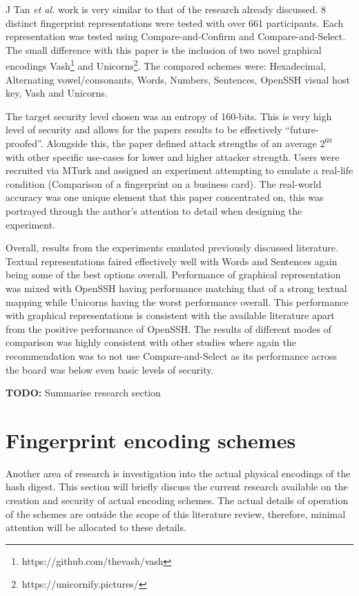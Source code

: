 J Tan \textit{et al.} work is very similar to that of the research already discussed. 8 distinct fingerprint representations were tested with over 661 participants. Each representation was tested using Compare-and-Confirm and Compare-and-Select. The small difference with this paper is the inclusion of two novel graphical encodings Vash\footnote{https://github.com/thevash/vash} and Unicorns\footnote{https://unicornify.pictures/}. The compared schemes were: Hexadecimal, Alternating vowel/consonants, Words, Numbers, Sentences, OpenSSH visual host key, Vash and Unicorns.

The target security level chosen was an entropy of 160-bits. This is very high level of security and allows for the papers results to be effectively ``future-proofed''. Alongside this, the paper defined attack strengths of an average $2^{60}$ with other specific use-cases for lower and higher attacker strength. Users were recruited via MTurk and assigned an experiment attempting to emulate a real-life condition (Comparison of a fingerprint on a business card). The real-world accuracy was one unique element that this paper concentrated on, this was portrayed through the author's attention to detail when designing the experiment.

Overall, results from the experiments emulated previously discussed literature. Textual representations faired effectively well with Words and Sentences again being some of the best options overall. Performance of graphical representation was mixed with OpenSSH having performance matching that of a strong textual mapping while Unicorns having the worst performance overall. This performance with graphical representations is consistent with the available literature apart from the positive performance of OpenSSH. The results of different modes of comparison was highly consistent with other studies where again the recommendation was to not use Compare-and-Select as its performance across the board was below even basic levels of security.

\textbf{TODO: } Summarise research section

\section{Fingerprint encoding schemes}
Another area of research is investigation into the actual physical encodings of the hash digest. This section will briefly discuss the current research available on the creation and security of actual encoding schemes. The actual details of operation of the schemes are outside the scope of this literature review, therefore, minimal attention will be allocated to these details.

